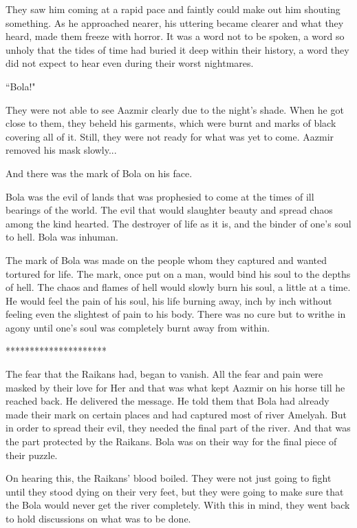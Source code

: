 \documentclass[twoside,11pt,titlepage]{article}
\begin{document}
They saw him coming at a rapid pace and faintly could make out him shouting something. As he approached nearer, his uttering became clearer and what they heard, made them freeze with horror. It was a word not to be spoken, a word so unholy that the tides of time had buried it deep within their history, a word they did not expect to hear even during their worst nightmares.

``Bola!"

They were not able to see Aazmir clearly due to the night's shade. When he got close to them, they beheld his garments, which were burnt and marks of black covering all of it. Still, they were not ready for what was yet to come. Aazmir removed his mask slowly...

And there was the mark of Bola on his face.

Bola was the evil of lands that was prophesied to come at the times of ill bearings of the world. The evil that would slaughter beauty and spread chaos among the kind hearted. The destroyer of life as it is, and the binder of one's soul to hell. Bola was inhuman.

The mark of Bola was made on the people whom they captured and wanted tortured for life. The mark, once put on a man, would bind his soul to the depths of hell. The chaos and flames of hell would slowly burn his soul, a little at a time. He would feel the pain of his soul, his life burning away, inch by inch without feeling even the slightest of pain to his body. There was no cure but to writhe in agony until one's soul was completely burnt away from within.

\bigskip
\begin{center}
*********************
\end{center}

The fear that the Raikans had, began to vanish. All the fear and pain were masked by their love for Her and that was what kept Aazmir on his horse till he reached back. He delivered the message. He told them that Bola had already made their mark on certain places and had captured most of river Amelyah. But in order to spread their evil, they needed the final part of the river. And that was the part protected by the Raikans. Bola was on their way for the final piece of their puzzle.

On hearing this, the Raikans' blood boiled. They were not just going to fight until they stood dying on their very feet, but they were going to make sure that the Bola would never get the river completely. With this in mind, they went back to hold discussions on what was to be done.
\end{document}
